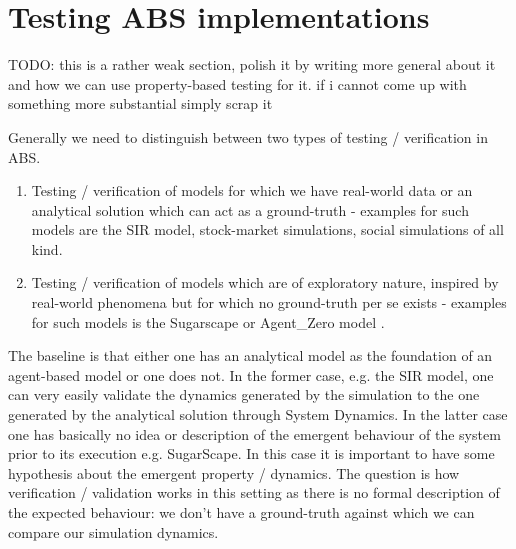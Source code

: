 \section*{Testing ABS implementations}
\label{sec:testingABS}
TODO: this is a rather weak section, polish it by writing more general about it and how we can use property-based testing for it. if i cannot come up with something more substantial simply scrap it

Generally we need to distinguish between two types of testing / verification in ABS.

\begin{enumerate}
	\item Testing / verification of models for which we have real-world data or an analytical solution which can act as a ground-truth - examples for such models are the SIR model, stock-market simulations, social simulations of all kind.
	\item Testing / verification of models which are of exploratory nature, inspired by real-world phenomena but for which no ground-truth per se exists - examples for such models is the Sugarscape \cite{epstein_growing_1996} or Agent\_Zero model \cite{epstein_agent_zero:_2014}.
\end{enumerate}

The baseline is that either one has an analytical model as the foundation of an agent-based model or one does not. In the former case, e.g. the SIR model, one can very easily validate the dynamics generated by the simulation to the one generated by the analytical solution through System Dynamics. In the latter case one has basically no idea or description of the emergent behaviour of the system prior to its execution e.g. SugarScape. In this case it is important to have some hypothesis about the emergent property / dynamics. The question is how verification / validation works in this setting as there is no formal description of the expected behaviour: we don't have a ground-truth against which we can compare our simulation dynamics.

